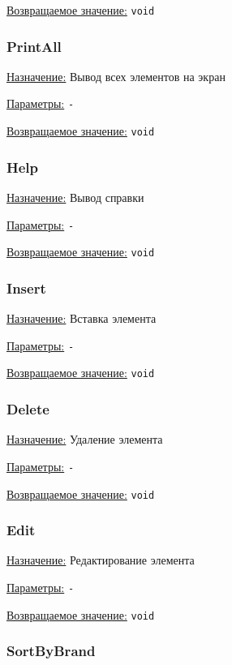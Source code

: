 \underline{Возвращаемое значение:} \verb|void|


\subsubsection*{PrintAll}

\underline{Назначение:} Вывод всех элементов на экран

\underline{Параметры:} \verb|-|

\underline{Возвращаемое значение:} \verb|void|


\subsubsection*{Help}

\underline{Назначение:} Вывод справки

\underline{Параметры:} \verb|-|

\underline{Возвращаемое значение:} \verb|void|


\subsubsection*{Insert}

\underline{Назначение:} Вставка элемента

\underline{Параметры:} \verb|-|

\underline{Возвращаемое значение:} \verb|void|


\subsubsection*{Delete}

\underline{Назначение:} Удаление элемента

\underline{Параметры:} \verb|-|

\underline{Возвращаемое значение:} \verb|void|


\subsubsection*{Edit}

\underline{Назначение:} Редактирование элемента

\underline{Параметры:} \verb|-|

\underline{Возвращаемое значение:} \verb|void|


\subsubsection*{SortByBrand}

